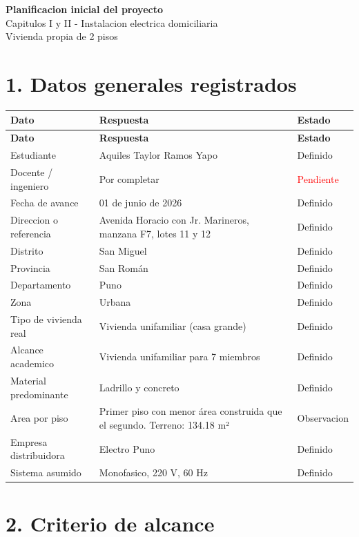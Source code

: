 \documentclass[12pt,a4paper]{article}
\newcommand{\pendiente}{\textcolor{red}{Pendiente}}
\newcommand{\obs}{\textcolor{orange!70!black}{Observacion}}
\newcommand{\ok}{\textcolor{green!50!black}{Definido}}
\begin{document}
\begin{center}
{\Large \textbf{Planificacion inicial del proyecto}}\\
{\large Capitulos I y II - Instalacion electrica domiciliaria}\\
{\normalsize Vivienda propia de 2 pisos}
\end{center}

\section*{1. Datos generales registrados}

\begin{longtable}{L{5.2cm}L{7.8cm}L{2.2cm}}
\toprule
\textbf{Dato} & \textbf{Respuesta} & \textbf{Estado} \\
\midrule
\endfirsthead
\toprule
\textbf{Dato} & \textbf{Respuesta} & \textbf{Estado} \\
\midrule
\endhead
Estudiante & Aquiles Taylor Ramos Yapo & \ok \\
Docente / ingeniero & Por completar & \pendiente \\
Fecha de avance & 01 de junio de 2026 & \ok \\
Direccion o referencia & Avenida Horacio con Jr. Marineros, manzana F7, lotes 11 y 12 & \ok \\
Distrito & San Miguel & \ok \\
Provincia & San Román & \ok \\
Departamento & Puno & \ok \\
Zona & Urbana & \ok \\
Tipo de vivienda real & Vivienda unifamiliar (casa grande) & \ok \\
Alcance academico & Vivienda unifamiliar para 7 miembros & \ok \\
Material predominante & Ladrillo y concreto & \ok \\
Area por piso & Primer piso con menor área construida que el segundo. Terreno: 134.18 m² & \obs \\
Empresa distribuidora & Electro Puno & \ok \\
Sistema asumido & Monofasico, 220 V, 60 Hz & \ok \\
\bottomrule
\end{longtable}

\section*{2. Criterio de alcance}
\end{document}
